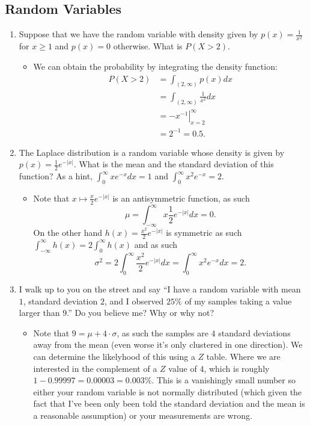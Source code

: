 \documentclass{article}
\begin{document}
\setcounter{subsection}{5}
\subsection{Random Variables}
\begin{enumerate}
\item Suppose that we have the random variable with density given by $p(x) = \frac{1}{x^2}$ for $x \geq 1$ and $p(x) = 0$ otherwise. What is $P(X > 2)$.
	\begin{itemize}
		\item We can obtain the probability by integrating the density function:
		$$
		\begin{aligned}
		P(X > 2) &= \int_{(2, \infty)} p(x) dx \\
		&= \int_{(2, \infty)} \frac{1}{x^2} dx \\
		&= \left. -x^{-1} \right|_{x = 2}^\infty \\
		&= 2^{-1} = 0.5.
		\end{aligned}
		$$
	\end{itemize}
\item The Laplace distribution is a random variable whose density is given by $p(x) = \frac{1}{2}e^{-|x|}$. What is the mean and the standard deviation of this function? As a hint, $\int_0^\infty x e^{-x} dx = 1$ and $\int_0^\infty x^2 e^{-x} = 2$.
	\begin{itemize}
	\item Note that $x \mapsto \frac{x}{2} e^{-|x|}$ is an antisymmetric function, as such
	$$
	\mu = \int_{-\infty}^\infty x \frac{1}{2}e^{-|x|} dx = 0.
	$$
	On the other hand $h(x) = \frac{x^2}{2}e^{-|x|}$ is symmetric as such $\int_{-\infty}^\infty h(x) = 2 \int_0^\infty h(x)$ and as such
	$$
	\sigma^2 = 2 \int_0^\infty \frac{x^2}{2} e^{- |x|} dx = \int_0^\infty x^2e^{-x} dx = 2.
	$$
	\end{itemize}
\item I walk up to you on the street and say “I have a random variable with mean $1$, standard deviation $2$, and I observed $25\%$ of my samples taking a value larger than $9$.” Do you believe me? Why or why not?
	\begin{itemize}
		\item Note that $9 = \mu + 4 \cdot \sigma$, as such the samples are $4$ standard deviations away from the mean (even worse it's only clustered in one direction). We can determine the likelyhood of this using a $Z$ table. Where we are interested in the complement of a $Z$ value of $4$, which is roughly $1 - 0.99997 = 0.00003 = 0.003\%$. This is a vanishingly small number so either your random variable is not normally distributed (which given the fact that I've been only been told the standard deviation and the mean is a reasonable assumption) or your measurements are wrong.
	\end{itemize}
\end{enumerate}
\end{document}
